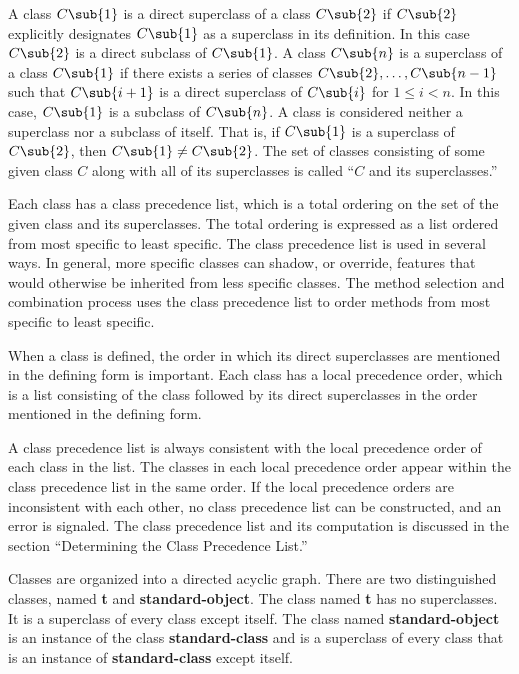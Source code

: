 A class $C\sub{1}$ is a {\bit direct superclass\/} of a class
$C\sub{2}$ if $C\sub{2}$ explicitly designates $C\sub{1}$ as a
superclass in its definition.  In this case $C\sub{2}$ is a {\bit
direct subclass\/} of $C\sub{1}$.  A class $C\sub{n}$ is a {\bit
superclass\/} of a class $C\sub{1}$ if there exists a series of
classes $C\sub{2},\ldots,C\sub{n-1}$ such that $C\sub{i+1}$ is a
direct superclass of $C\sub{i}$ for $1 \leq i<n$.  In this case, 
$C\sub{1}$ is a {\bit subclass\/} of $C\sub{n}$.  A class is
considered neither a superclass nor a subclass of itself.  That is, if
$C\sub{1}$ is a superclass of $C\sub{2}$, then $C\sub{1} \neq
C\sub{2}$.  The set of classes consisting of some given
class $C$ along with all of its superclasses is called ``$C$ and its
superclasses.''

Each class has a {\bit class precedence list}, which is a total ordering
on the set of the given class and its superclasses.  The total ordering
is expressed as a list ordered from most specific to least specific.
The class precedence list is used in several ways.  In general, more
specific classes can {\bit shadow}, or override, features that would
otherwise be inherited from less specific classes.  The method selection
and combination process uses the class precedence list to order methods
from most specific to least specific. 
 
When a class is defined, the order in which its direct superclasses
are mentioned in the defining form is important.  Each class has a
{\bit local precedence order\/}, which is a list consisting of the
class followed by its direct superclasses in the order mentioned
in the defining form.

A class precedence list is always consistent with the local precedence
order of each class in the list.  The classes in each local precedence
order appear within the class precedence list in the same order.  If
the local precedence orders are inconsistent with each other, no class
precedence list can be constructed, and an error is signaled.
The class precedence list and its computation is discussed
in the section ``Determining the Class Precedence List.''

Classes are organized into a {\bit directed acyclic graph}.  There are
two distinguished classes, named {\bf t} and {\bf standard-object}.
The class named {\bf t} has no superclasses.  It is a superclass of
every class except itself.  The class named {\bf standard-object} is
an instance of the class {\bf standard-class} and is a superclass of
every class that is an instance of {\bf standard-class} except itself.

